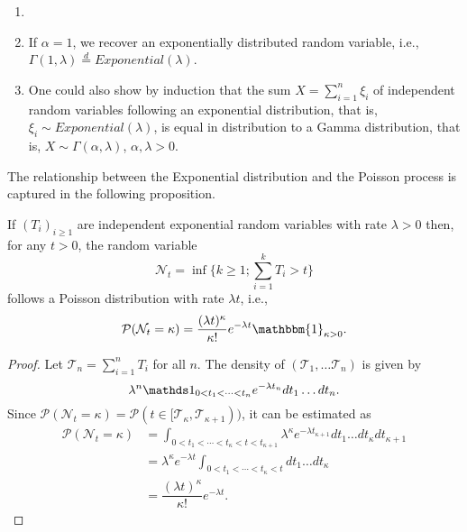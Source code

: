 \begin{remark}\label{remark_Gamma}
\begin{enumerate}[label=(\roman*)]
        \item[]
        \item If $\alpha = 1$, we recover an exponentially distributed random variable, i.e., \break $ \Gamma(1, \lambda) \overset{d}{=}  Exponential(\lambda)$.
        \item One could also show by induction that the sum $X = \sum_{i=1}^n \xi_i $ of independent random variables following an exponential distribution, that is,  $\xi_i \sim Exponential(\lambda)$, is equal in distribution to a Gamma distribution, that is, $X \sim \Gamma(\alpha,\lambda)$, $\alpha, \lambda > 0$.
   \end{enumerate}
\end{remark}
The relationship between the Exponential distribution and the Poisson process is captured in the following proposition.
\begin{proposition}\label{prop_Poisson}
If $(T_i)_{i \geq 1}$ are independent exponential random variables with rate $\lambda > 0$ then, for any $t >0 $, the random variable 
\begin{equation}
   \mathcal{N}_t = \inf \{k \geq 1; \sum_{i = 1}^k T_i > t\}
\end{equation}
follows a Poisson distribution with rate $\lambda t$, i.e.,
 \begin{equation}       
        \mathcal{P} (\mathcal{N}_t = \kappa) = \dfrac{(\lambda t)^\kappa}{\kappa !}e^{-\lambda t}\mathbbm{1}_{ \kappa > 0}.     
 \end{equation}
 \end{proposition}
\begin{proof}
Let $\mathcal{T}_n = \sum_{i = 1}^n T_i $ for all $n$. The density of $(\mathcal{T}_1, \ldots \mathcal{T}_n)$ is given by 
\begin{equation*}
    \lambda^n \One_{0 < t_1 < \cdots < t_n}e^{-\lambda t_n} dt_1 \ldots dt_n.
\end{equation*}
Since $\mathcal{P} (\mathcal{N}_t = \kappa) = \mathcal{P}(t \in [\mathcal{T}_\kappa,  \mathcal{T}_{\kappa+1}))$, it can be estimated as 
\begin{equation*}
    \begin{split}
        \mathcal{P} (\mathcal{N}_t = \kappa) &= \int_{0 < t_1 < \cdots < t_\kappa< t< t_{\kappa+1}}\lambda^\kappa e^{-\lambda t_{\kappa +1}} dt_1 \ldots dt_\kappa dt_{\kappa +1}\\
        &= \lambda^\kappa e^{-\lambda t} \int_{0 < t_1 < \cdots < t_\kappa< t} dt_1 \ldots dt_\kappa\\
        &= \dfrac{(\lambda t)^\kappa}{\kappa !}e^{-\lambda t}.
    \end{split}
\end{equation*}
\end{proof}

